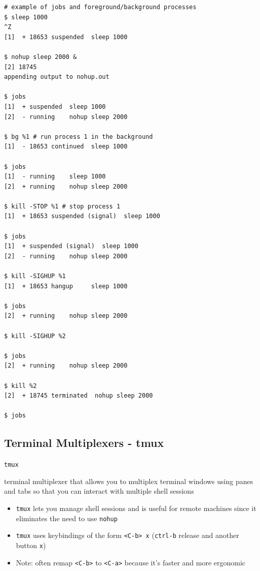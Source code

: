 \documentclass[letterpaper,12pt]{article}
\newcommand*{\lstitem}[1]{
  \setbox0\hbox{\lstinline{#1}}
  \item[\usebox0]
}
\begin{document}
\begin{lstlisting}
# example of jobs and foreground/background processes
$ sleep 1000
^Z
[1]  + 18653 suspended  sleep 1000

$ nohup sleep 2000 &
[2] 18745
appending output to nohup.out

$ jobs
[1]  + suspended  sleep 1000
[2]  - running    nohup sleep 2000

$ bg %1 # run process 1 in the background
[1]  - 18653 continued  sleep 1000

$ jobs
[1]  - running    sleep 1000
[2]  + running    nohup sleep 2000

$ kill -STOP %1 # stop process 1
[1]  + 18653 suspended (signal)  sleep 1000

$ jobs
[1]  + suspended (signal)  sleep 1000
[2]  - running    nohup sleep 2000

$ kill -SIGHUP %1
[1]  + 18653 hangup     sleep 1000

$ jobs
[2]  + running    nohup sleep 2000

$ kill -SIGHUP %2

$ jobs
[2]  + running    nohup sleep 2000

$ kill %2
[2]  + 18745 terminated  nohup sleep 2000

$ jobs

\end{lstlisting}


\subsection{Terminal Multiplexers - tmux}

\begin{description}
 \lstitem{tmux} terminal multiplexer that allows you to multiplex terminal windows using panes and tabs so that you can interact with multiple shell sessions
\end{description}

\begin{itemize}
 \item \lstinline{tmux} lets you manage shell sessions and is useful for remote machines since it eliminates the need to use \lstinline{nohup}
 \item \lstinline{tmux} uses keybindings of the form \lstinline{<C-b> x} (\lstinline{ctrl-b} release and another button \lstinline{x})
 \item Note: often remap \lstinline{<C-b>} to \lstinline{<C-a>} because it's faster and more ergonomic
\end{itemize}
\end{document}
